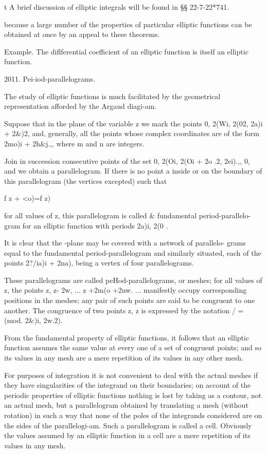 t A brief discussion of elliptic integrals will be found in §§
22-7-22*741.

%
%

because a large number of the properties of particular elliptic
functions can be obtained at once by an appeal to these theorems.

Example. The diflferential coefficient of an elliptic function is
itself an elliptic function.

2011. Pei-iod-parallelograms.

The study of elliptic functions is much facilitated by the geometrical
representation afforded by the Argaud diagi-am.

Suppose that in the plane of the variable z we mark the points 0,
2(Wi, 2(02, 2a)i + 2\&)2, and, generally, all the points whose complex
coordinates are of the form 2mo)i + 2h\&j.,, where m and n are
integers.

Join in succession consecutive points of the set 0, 2(Oi, 2(Oi + 2o
.2, 2ei).,, 0, and we obtain a parallelogram. If there is no point a
inside or on the boundary of this parallelogram (the vertices
excepted) such that

f z + <o)=f z)

for all values of z, this parallelogram is called \& fundamental
period-parallelo- gram for an elliptic function with periods 2a)i, 2(0
.

It is clear that the -plane may be covered with a network of
parallelo- grams equal to the fundamental period-parallelogram and
similarly situated, each of the points 2?/ia)i + 2na), being a vertex
of four parallelograms.

These parallelograms are called peHod-parallelograms, or meshes; for
all values of z, the points z, z- 2w, ... z +2m(o +2nw. ...
manifestly occupy corresponding positions in the meshes; any pair of
such points are said to be congruent to one another. The congruence of
two points z, z is expressed by the notation / = (mod. 2\&)i, 2w.2).

From the fundamental property of elliptic functions, it follows that
an elliptic function assumes the same value at every one of a set of
congruent points; and so its values in any mesh are a mere repetition
of its values in any other mesh.

For purposes of integration it is not convenient to deal with the
actual meshes if they have singularities of the integrand on their
boundaries; on account of the periodic properties of elliptic
functions nothing is lost by taking as a contour, not an actual mesh,
but a parallelogram obtained by translating a mesh (without rotation)
in such a way that none of the poles of the integrands considered are
on the sides of the parallelogi-am. Such a parallelogram is called a
cell. Obviously the values assumed by an elliptic function in a cell
are a mere repetition of its values in any mesh.

